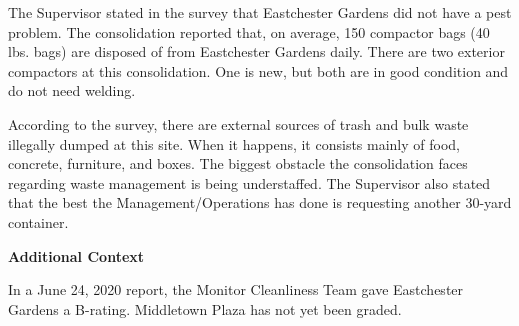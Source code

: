  

The Supervisor stated in the survey that Eastchester Gardens did not have a pest problem. The consolidation reported that, on average, 150 compactor bags (40 lbs. bags) are disposed of from Eastchester Gardens daily. There are two exterior compactors at this consolidation. One is new, but both are in good condition and do not need welding. 

According to the survey, there are external sources of trash and bulk waste illegally dumped at this site.  When it happens, it consists mainly of food, concrete, furniture, and boxes. The biggest obstacle the consolidation faces regarding waste management is being understaffed. The Supervisor also stated that the best the Management/Operations has done is requesting another 30-yard container.

\textbf{Additional Context}  

In a June 24, 2020 report, the Monitor Cleanliness Team gave Eastchester Gardens a B-rating. Middletown Plaza has not yet been graded. 